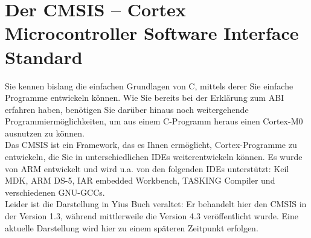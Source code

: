 \section{Der CMSIS – Cortex Microcontroller Software Interface Standard}

Sie kennen bislang die einfachen Grundlagen von C, mittels derer Sie einfache Programme entwickeln können. Wie Sie bereits bei der Erklärung zum ABI erfahren haben, benötigen Sie darüber hinaus noch weitergehende Programmiermöglichkeiten, um aus einem C-Programm heraus einen Cortex-M0 ausnutzen zu können.\\

Das CMSIS ist ein Framework, das es Ihnen ermöglicht, Cortex-Programme zu entwickeln, die Sie in unterschiedlichen IDEs weiterentwickeln können. Es wurde von ARM entwickelt und wird u.a. von den folgenden IDEs unterstützt: Keil MDK, ARM DS-5, IAR embedded Workbench, TASKING Compiler und verschiedenen GNU-GCCs.\\

Leider ist die Darstellung in Yius Buch veraltet: Er behandelt hier den CMSIS in der Version 1.3, während mittlerweile die Version 4.3 veröffentlicht wurde. Eine aktuelle Darstellung wird hier zu einem späteren Zeitpunkt erfolgen.

